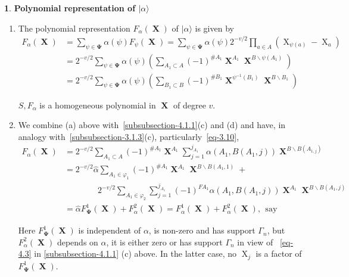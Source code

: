 \documentclass[a4paper,12pt]{article}
\DeclareMathOperator{\x}{\mathrm{X}}
\theoremstyle{definition}
\theoremstyle{underlinethm}
\theoremstyle{definition}
\newtheorem{subsubsec}{}[subsection]
\begin{document}
\begin{subsubsec}\label{subsubsection-4.1.2}
\textbf{Polynomial representation of $| \alpha \rangle $} 

\begin{enumerate}[label=(\alph*)]
\item The polynomial representation $F_{\alpha}(\boldsymbol{\x})$ of $| \alpha \rangle$ is given by
\begin{align*}
F_{\alpha}(\boldsymbol{\x}) &= \sum_{\psi \in \boldsymbol{\Psi}} \alpha(\psi) F_{\psi} (\boldsymbol{\x}) = \sum_{\psi \in \boldsymbol{\Psi}} \alpha(\psi) 2^{-v/2} \prod_{a \in A} \left(\x_{\psi(a)} - \x_{a}\right)\\
& = 2^{-v/2} \sum_{\psi \in \boldsymbol{\Psi}} \alpha(\psi)\left(\sum_{A_{1}\subset A} (-1)^{\#A_{1}} \boldsymbol{\x}^{A_{1}} \boldsymbol{\x}^{B \smallsetminus \psi (A_{1})} \right)\\
& = 2^{-v/2} \sum_{\psi \in \boldsymbol{\Psi}} \alpha(\psi) \left(\sum_{B_{1}\subset B} (-1)^{\# B_{1}} \boldsymbol{\x}^{\psi^{-1}(B_{1})} \boldsymbol{\x}^{B \smallsetminus B_{1}} \right)\tag{4.7}\label{eq-4.7}
\end{align*}

$S, F_{\alpha}$ is a homogeneous polynomial in $\boldsymbol{\x}$ of degree $v$.

\item We combine (a) above with~\eqref{subsubsection-4.1.1}(c) and (d) and have, in analogy with~\eqref{subsubsection-3.1.3}(c), particularly~\eqref{eq-3.10},
\begin{align*}
F_{\alpha}(\boldsymbol{\x}) &= 2^{-v/2} \sum_{A_{1}\subset A}(-1)^{\# A_{1}} \boldsymbol{\x}^{A_{1}} \sum_{j=1}^{j_{A_{1}}} \alpha(A_{1}, B(A_{1}, j)) \boldsymbol{\x}^{B\smallsetminus B(A_{1, j})}\\
& = 2^{-v/2} \hat{\alpha} \sum_{A_{1}\in \varphi_{1}} (-1)^{\# A_{1}} \boldsymbol{\x}^{A_{1}} \boldsymbol{\x}^{B \smallsetminus B(A_{1},1)} +\\
    & \qquad\qquad2^{-v/2} \sum_{A_{1}\in \varphi_{2}} \sum_{j=1}^{j_{A_{1}}} (-1)^{F A_{1}} \alpha(A_{1}, B(A_{1}, j)) \boldsymbol{\x}^{A_{1}} \boldsymbol{\x}^{B \smallsetminus B(A_{1}, j)}\\
 & = \hat{\alpha} F_{\boldsymbol{\Psi}}^{1} (\boldsymbol{\x}) + F_{\alpha}^{2}(\boldsymbol{\x}) = F_{\alpha}^{1}(\boldsymbol{\x}) + F_{\alpha}^{2} (\boldsymbol{\x}),~~ \text{say}\tag{4.8}\label{eq-4.8}    
\end{align*}

Here $F_{\boldsymbol{\Psi}}^{1}(\boldsymbol{\x})$ is independent of $\alpha$, is non-zero and has support $\Gamma_{n}$, but $F_{\alpha}^{2}(\boldsymbol{\x})$ depends on $\alpha$, it is either zero or has support $\Gamma_{n}$ in view of ~\eqref{eq-4.3} in \eqref{subsubsection-4.1.1} (c) above. In the latter case, no $\x_{j}$ is a factor of $F_{\boldsymbol{\Psi}}^{1}(\boldsymbol{\x})$.


\end{enumerate}
\end{subsubsec}
\end{document}
